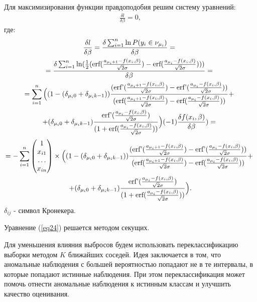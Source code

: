 Для максимизирования функции правдоподобия решим систему уравнений:
\begin{eqnarray}
    \label{eq24}\frac{\delta l}{\delta \beta}=0,
\end{eqnarray}
где:
\begin{multline}
    \label{eq27}\frac{\delta l}{\delta \beta}=\frac{\delta \sum_{i=1}^{n}\ln P(y_i\in \nu_{\mu_i})}{\delta \beta}=~\\
    =\frac{\delta \sum_{i=1}^{n} \ln(\frac{1}{2}(\textup{erf}(\frac{a_{\mu_i+1}-f(x_i,\beta)}{\sqrt{2}\sigma})-\textup{erf}(\frac{a_{\mu_i}-f(x_i,\beta)}{\sqrt{2}\sigma})) )         }{\delta \beta}=~\\
    =  \sum_{i=1}^{n}\Big((1-(\delta_{\mu_i 0}+\delta_{\mu_i k-1}))\frac{(\textup{erf'}(\frac{a_{\mu_i+1}-f(x_i,\beta)}{\sqrt{2}\sigma})-\textup{erf'}(\frac{a_{\mu_i}-f(x_i,\beta)}{\sqrt{2}\sigma}))}{ (\textup{erf}(\frac{a_{\mu_i+1}-f(x_i,\beta)}{\sqrt{2}\sigma})-\textup{erf}(\frac{a_{\mu_i}-f(x_i,\beta)}{\sqrt{2}\sigma}))}+~\\
    +(\delta_{\mu_i 0}+\delta_{\mu_i k-1})\frac{\textup{erf'}(\frac{a_{\mu_i}-f(x_i,\beta)}{\sqrt{2}\sigma})}{(1+\textup{erf}(\frac{a_{\mu_i}-f(x_i,\beta)}{\sqrt{2}\sigma}))}\Big)  (-1) \frac{\delta f(x_i,\beta)}{\delta \beta} )=~
\end{multline}
\begin{multline}
    \nonumber 
    =-\sum_{i=1}^{n}\begin{pmatrix}
        1\\
        x_{i1}\\
        \dots\\
        x_{in}
    \end{pmatrix}\times  \Big((1-(\delta_{\mu_i 0}+\delta_{\mu_i k-1}))\frac{(\textup{erf'}(\frac{a_{\mu_i+1}-f(x_i,\beta)}{\sqrt{2}\sigma})-\textup{erf'}(\frac{a_{\mu_i}-f(x_i,\beta)}{\sqrt{2}\sigma}))}{ (\textup{erf}(\frac{a_{\mu_i+1}-f(x_i,\beta)}{\sqrt{2}\sigma})-\textup{erf}(\frac{a_{\mu_i}-f(x_i,\beta)}{\sqrt{2}\sigma}))}+~\\
    +(\delta_{\mu_i 0}+\delta_{\mu_i k-1})\frac{\textup{erf'}(\frac{a_{\mu_i}-f(x_i,\beta)}{\sqrt{2}\sigma})}{(1+\textup{erf}(\frac{a_{\mu_i}-f(x_i,\beta)}{\sqrt{2}\sigma}))}\Big) .
\end{multline}
$\delta_{ij}$ - символ Кронекера.

Уравнение (\ref{eq24}) решается методом секущих.

Для уменьшения влияния выбросов будем использовать переклассификацию выборки методом $K$ ближайших соседей. 
Идея заключается в том, что аномальные наблюдения с большей вероятностью попадают не в те интервалы, в которые попадают истинные наблюдения. 
При этом переклассификация может помочь отнести аномальные наблюдения к истинным классам и улучшить качество оценивания.

